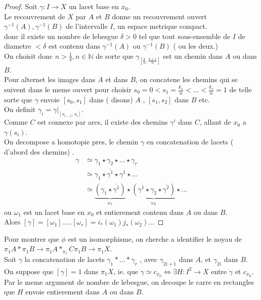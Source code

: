 \documentclass[../main.tex]{subfiles}
\begin{document}
\begin{proof}
Soit $\gamma: I \to X$ un lacet base en $x_0$.\\
Le recouvrement de $X$ par $A$ et $B$ donne un recouvrement ouvert $\gamma^{-1}( A) ,\gamma^{-1}( B) $ de l'intervalle $I$, un espace metrique compact.\\
donc il existe un nombre de lebesgue $\delta>0$ tel que tout sous-ensemble de $I$ de diametre $< \delta$ est contenu dans $\gamma^{-1}( A) $ ou $\gamma^{-1}( B) $ ( ou les deux.)\\
On choisit donc $n > \frac{1}{\delta}, n \in \mathbb{N}$ de sorte que $\gamma_{[\frac{k}{n}, \frac{k+1}{n}]} $ est un chemin dans $A$  ou dans $B$.\\
Pour alternet les images dans $A$ et dans $B$, on concatene les chemins qui se suivent dans le meme ouvert pour choisir $s_0=0 < s_1= \frac{k_1}{n} < \ldots < \frac{k_r}{n} = 1 $ de telle sorte que $\gamma$ envoie $ [ s_0,s_1] $ dans ( disons) $A$ , $ [ s_1,s_2] $ dans $B$ etc.\\
On definit $\gamma_i = \gamma|_{ [ s_{i-1} , s_i] } $.\\
Comme $C$ est connexe par arcs, il existe des chemins $\gamma^{i}$ dans $C$, allant de $x_0$ a $\gamma( s_i) $.\\
On decompose a homotopie pres, le chemin $\gamma$ en concatenation de lacets ( d'abord des chemins) .\\
\begin{align*}
	\gamma &\simeq \gamma_1 \star \gamma_2 \star\ldots \star \gamma_r \\
	&\simeq \gamma_1 \star \overline{ \gamma^{1} } \star \gamma^{1} \star\ldots\\
	&\simeq \underbrace{( \gamma_1 \star \overline { \gamma^{1}} ) }_{ \omega_1	}\star \underbrace{( \gamma^{1}\star \gamma_2 \star\overline{  \gamma^{2} })}_{ \omega_2} \star\ldots
\end{align*}
ou $\omega_1$ est un lacet base en $x_0$ et entierement contenu dans $A$ ou dans $B$.\\
Alors $ [ \gamma] = [ \omega_1] . \ldots . [ \omega_r] = i_* ( \omega_1) j_*( \omega_2) \ldots$ 

\end{proof}
Pour montrer que $\phi$ est un isomorphisme, on cherche a identifier le noyau de $\pi_1A \ast \pi_1B \to \pi_1 A \ast_{\pi_1} C \pi_1B \to \pi_1X$.\\
Soit $\gamma$ la concatenation de lacets $\gamma_1\ast \ldots\ast \gamma_r$ , avec $\gamma_{2i+1} $  dans $A$, et $ \gamma_{2i}  $ dans $B$.\\
On suppose que $[ \gamma ]=1$ dans $\pi_1X$, ie. que $\gamma\simeq c_{x_0} \iff \exists H : I^{2} \to X $ entre $\gamma$ et $c_{x_0} $.\\
Par le meme argument de nombre de lebesgue, on decoupe le carre en rectangles que $H$ envoie entierement dans $A$ ou dans $B$.
\end{document}
